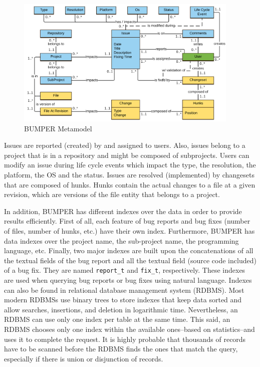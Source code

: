 \documentclass[12pt]{report}
\begin{document}
\begin{figure}
  \centering
  \includegraphics[width=0.95\textwidth]{media/bumper-model.png}
  \caption{BUMPER Metamodel\label{fig:bumper-metamodel}}
\end{figure}

Issues are reported (created) by and assigned to users. Also, issues
belong to a project that is in a repository and might be composed of
subprojects. Users can modify an issue during life cycle events which
impact the type, the resolution, the platform, the OS and the status.
Issues are resolved (implemented) by changesets that are composed of
hunks. Hunks contain the actual changes to a file at a given revision,
which are versions of the file entity that belongs to a project.

In addition, BUMPER has different indexes over the data in order to
provide results efficiently. First of all, each feature of bug reports
and bug fixes (number of files, number of hunks, etc.) have their own
index. Furthermore, BUMPER has data indexes over the project name, the
sub-project name, the programming language, etc. Finally, two major
indexes are built upon the concatenations of all the textual fields of
the bug report and all the textual field (source code included) of a bug
fix. They are named \lstinline!report_t! and \lstinline!fix_t!,
respectively. These indexes are used when querying bug reports or bug
fixes using natural language. Indexes can also be found in relational
database management system (RDBMS). Most modern RDBMSs use binary trees
to store indexes that keep data sorted and allow searches, insertions,
and deletion in logarithmic time. Nevertheless, an RDBMS can use only
one index per table at the same time. This said, an RDBMS chooses only
one index within the available ones--based on statistics--and uses it to
complete the request. It is highly probable that thousands of records
have to be scanned before the RDBMS finds the ones that match the query,
especially if there is union or disjunction of records.
\end{document}
